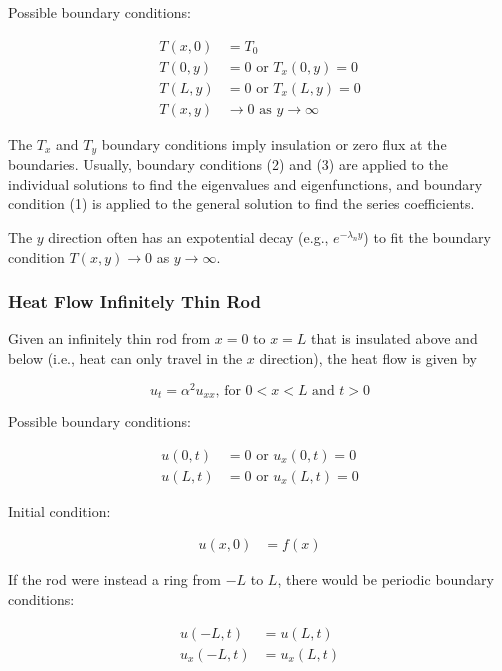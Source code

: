 Possible boundary conditions:

\begin{align*}
    T(x, 0) & = T_0         \tag{1}                           \\
    T(0, y) & = 0 \text{ or } T_x(0, y) = 0           \tag{2} \\
    T(L, y) & = 0 \text{ or } T_x(L, y) = 0           \tag{3} \\
    T(x, y) & \to 0 \text{ as } y \to \infty
\end{align*}

The $T_x$ and $T_y$ boundary conditions imply insulation or zero flux at the boundaries. Usually, boundary conditions (2) and (3) are applied to the individual solutions to find the eigenvalues and eigenfunctions, and boundary condition (1) is applied to the general solution to find the series coefficients.

\vsp

The $y$ direction often has an expotential decay (e.g., $e^{-\lambda_n y}$) to fit the boundary condition $T(x, y) \to 0$ as $y \to \infty$.

\subsubsection{Heat Flow Infinitely Thin Rod}

Given an infinitely thin rod from $x = 0$ to $x = L$ that is insulated above and below (i.e., heat can only travel in the $x$ direction), the heat flow is given by

\begin{equation*}
    u_t = \alpha^2 u_{xx}\text{, for } 0 < x < L \text{ and } t > 0
\end{equation*}

Possible boundary conditions:

\begin{align*}
    u(0, t) & = 0 \text{ or } u_x(0, t) = 0 \\
    u(L, t) & = 0 \text{ or } u_x(L, t) = 0
\end{align*}

Initial condition:

\begin{align*}
    u(x, 0) & = f(x)
\end{align*}

If the rod were instead a ring from $-L$ to $L$, there would be periodic boundary conditions:

\begin{align*}
    u(-L, t)   & = u(L, t)   \\
    u_x(-L, t) & = u_x(L, t)
\end{align*}

